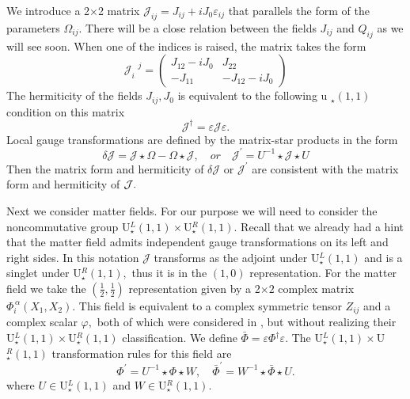 \documentclass[a4paper,12pt]{article}
\begin{document}
We introduce a 2$\times $2 matrix $\mathcal{J}_{ij}=J_{ij}+iJ_{0}\varepsilon
_{ij}$ that parallels the form of the parameters $\Omega _{ij}.$ There will
be a close relation between the fields $J_{ij}$ and $Q_{ij}$ as we will see
soon. When one of the indices is raised, the matrix takes the form 
\begin{equation}
\mathcal{J}_{i}^{\,\,\,\,\,j}=\left( 
\begin{array}{cc}
J_{12}-iJ_{0} & J_{22} \\ 
-J_{11} & -J_{12}-iJ_{0}
\end{array}
\right)  \label{J}
\end{equation}
The hermiticity of the fields $J_{ij},J_{0}$ is equivalent to the following u%
$_{\star }\left( 1,1\right) $ condition on this matrix 
\begin{equation}
\mathcal{J}^{\dagger }=\varepsilon \mathcal{J}\varepsilon .
\end{equation}
Local gauge transformations are defined by the matrix-star products in the
form 
\begin{equation}
\delta \mathcal{J}=\mathcal{J}\star \Omega -\Omega \star \mathcal{J},\quad
or\quad \mathcal{J}^{\prime }=U^{-1}\star \mathcal{J}\star U
\end{equation}
Then the matrix form and hermiticity of $\delta \mathcal{J}$ or $\mathcal{J}%
^{\prime }$ are consistent with the matrix form and hermiticity of $\mathcal{%
J}.$

Next we consider matter fields. For our purpose we will need to consider the
noncommutative group U$_{\star }^{L}\left( 1,1\right) \times $U$_{\star
}^{R}\left( 1,1\right) .$ Recall that we already had a hint that the matter
field admits independent gauge transformations on its left and right sides.
In this notation $\mathcal{J}$ transforms as the adjoint under U$_{\star
}^{L}\left( 1,1\right) $ and is a singlet under U$_{\star }^{R}\left(
1,1\right) ,$ thus it is in the $\left( 1,0\right) $ representation. For the
matter field we take the $\left( \frac{1}{2},\frac{1}{2}\right) $
representation given by a 2$\times 2$ complex matrix $\Phi _{i}^{\,\alpha
}\left( X_{1},X_{2}\right) .$ This field is equivalent to a complex
symmetric tensor $Z_{ij}$ and a complex scalar $\varphi ,$ both of which
were considered in \cite{NCSp}, but without realizing their U$_{\star
}^{L}\left( 1,1\right) \times $U$_{\star }^{R}\left( 1,1\right) $
classification. We define $\bar{\Phi}=\varepsilon \Phi ^{\dagger
}\varepsilon .$ The U$_{\star }^{L}\left( 1,1\right) \times $U$_{\star
}^{R}\left( 1,1\right) $ transformation rules for this field are 
\begin{equation}
\Phi ^{\prime }=U^{-1}\star \Phi \star W,\quad \bar{\Phi}^{\prime
}=W^{-1}\star \bar{\Phi}\star U.
\end{equation}
where $U\in $U$_{\star }^{L}\left( 1,1\right) $ and $W\in $U$_{\star
}^{R}\left( 1,1\right) .$
\end{document}
